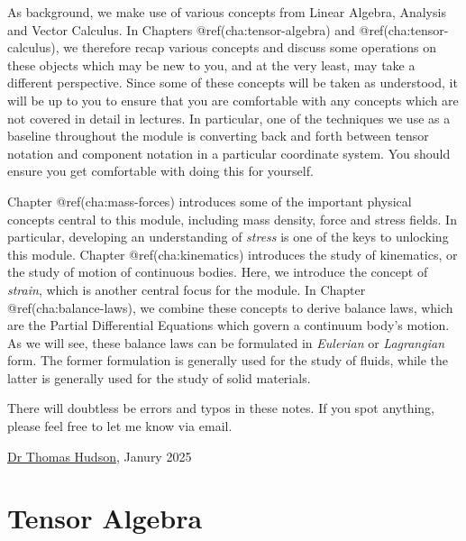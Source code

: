 \documentclass[
  letterpaper,
  DIV=11,
  numbers=noendperiod]{scrreprt}
\theoremstyle{plain}
\theoremstyle{remark}
\begin{document}
As background, we make use of various concepts from Linear Algebra,
Analysis and Vector Calculus. In Chapters @ref(cha:tensor-algebra) and
@ref(cha:tensor-calculus), we therefore recap various concepts and
discuss some operations on these objects which may be new to you, and at
the very least, may take a different perspective. Since some of these
concepts will be taken as understood, it will be up to you to ensure
that you are comfortable with any concepts which are not covered in
detail in lectures. In particular, one of the techniques we use as a
baseline throughout the module is converting back and forth between
tensor notation and component notation in a particular coordinate
system. You should ensure you get comfortable with doing this for
yourself.

Chapter @ref(cha:mass-forces) introduces some of the important physical
concepts central to this module, including mass density, force and
stress fields. In particular, developing an understanding of
\emph{stress} is one of the keys to unlocking this module. Chapter
@ref(cha:kinematics) introduces the study of kinematics, or the study of
motion of continuous bodies. Here, we introduce the concept of
\emph{strain}, which is another central focus for the module. In Chapter
@ref(cha:balance-laws), we combine these concepts to derive balance
laws, which are the Partial Differential Equations which govern a
continuum body's motion. As we will see, these balance laws can be
formulated in \emph{Eulerian} or \emph{Lagrangian} form. The former
formulation is generally used for the study of fluids, while the latter
is generally used for the study of solid materials.

There will doubtless be errors and typos in these notes. If you spot
anything, please feel free to let me know via email.

\href{https://sites.google.com/view/thudso/}{Dr Thomas Hudson}, Janury
2025


\chapter{Tensor Algebra}\label{sec-tensor-algebra}

\newcommand{\bfa}{{\boldsymbol{a}}}
\newcommand{\bfb}{{\boldsymbol{b}}}
\newcommand{\bfc}{{\boldsymbol{c}}}
\newcommand{\bfd}{{\boldsymbol{d}}}
\newcommand{\bfe}{{\boldsymbol{e}}}
\newcommand{\bff}{{\boldsymbol{f}}}
\newcommand{\bfg}{{\boldsymbol{g}}}
\newcommand{\bfh}{{\boldsymbol{h}}}
\newcommand{\bfi}{{\boldsymbol{i}}}
\newcommand{\bfj}{{\boldsymbol{j}}}
\newcommand{\bfk}{{\boldsymbol{k}}}
\newcommand{\bfl}{{\boldsymbol{l}}}
\newcommand{\bfm}{{\boldsymbol{m}}}
\newcommand{\bfn}{{\boldsymbol{n}}}
\newcommand{\bfo}{{\boldsymbol{o}}}
\newcommand{\bfp}{{\boldsymbol{p}}}
\newcommand{\bfq}{{\boldsymbol{q}}}
\newcommand{\bfr}{{\boldsymbol{r}}}
\newcommand{\bfs}{{\boldsymbol{s}}}
\newcommand{\bft}{{\boldsymbol{t}}}
\newcommand{\bfu}{{\boldsymbol{u}}}
\newcommand{\bfv}{{\boldsymbol{v}}}
\newcommand{\bfw}{{\boldsymbol{w}}}
\newcommand{\bfx}{{\boldsymbol{x}}}
\newcommand{\bfy}{{\boldsymbol{y}}}
\newcommand{\bfz}{{\boldsymbol{z}}}
\end{document}
